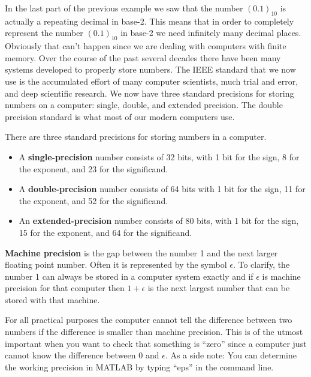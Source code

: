 In the last part of the previous example we saw that the number $(0.1)_{10}$ is actually a
repeating decimal in base-2.  This means that in order to completely represent the number
$(0.1)_{10}$ in base-2 we need infinitely many decimal places.  Obviously that can't
happen since we are dealing with computers with finite memory.  Over the course of the
past several decades there have been many systems developed to properly store numbers.
The IEEE standard that we now use is the accumulated effort of many computer scientists,
much trial and error, and deep scientific research.  We now have three standard precisions
for storing numbers on a computer: single, double, and extended precision.  The double
precision standard is what most of our modern computers use.

\begin{definition}
    There are three standard precisions for storing numbers in a computer.
    \begin{itemize}
        \item A {\bf single-precision} number consists of 32 bits, with 1 bit for the
            sign, 8 for the exponent, and 23 for the significand.
        \item A {\bf double-precision} number consists of 64 bits with 1 bit for the sign,
            11 for the exponent, and 52 for the significand.
        \item An {\bf extended-precision} number consists of 80 bits, with 1 bit for the
            sign, 15 for the exponent, and 64 for the significand.
    \end{itemize}
\end{definition}

\begin{definition}
    {\bf Machine precision} is the gap between the number 1 and the next larger floating
    point number. Often it is represented by the symbol $\epsilon$. To clarify, the number 1 can
    always be stored in a computer system exactly and if $\epsilon$ is machine
    precision for that computer then $1+\epsilon$ is the next largest number that can
    be stored with that machine. 
\end{definition}
For all practical purposes the computer cannot tell the difference between two numbers if
the difference is smaller than machine precision. This is of the utmost important when you
want to check that something is ``zero'' since a computer just cannot know the difference
between $0$ and $\epsilon$.
As a side note: You can determine the working precision in MATLAB by typing ``eps'' in the
command line.



